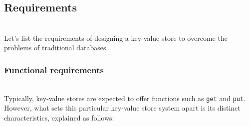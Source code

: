 

\subsection{Requirements}\label{MAsBeqDWYmLPkkIRvY6PP}
\\
Let's list the requirements of designing a key-value store to overcome the problems of traditional databases.

\subsubsection{Functional requirements}\label{CtIw12xjK_DrJYMPBBwg7}
\\
Typically, key-value stores are expected to offer functions such as \texttt{get} and \texttt{put}. However, what sets this particular key-value store system apart is its distinct characteristics, explained as follows:

